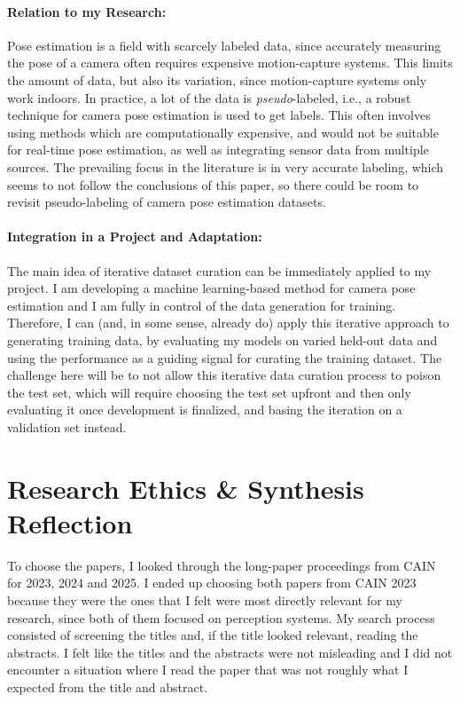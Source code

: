 \documentclass[11pt]{article}
\begin{document}
\paragraph{Relation to my Research:}
Pose estimation is a field with scarcely labeled data, since accurately measuring the pose of a camera often requires expensive motion-capture systems.
This limits the amount of data, but also its variation, since motion-capture systems only work indoors.
In practice, a lot of the data is \emph{pseudo}-labeled, i.e., a robust technique for camera pose estimation is used to get labels.
This often involves using methods which are computationally expensive, and would not be suitable for real-time pose estimation, as well as integrating sensor data from multiple sources.
The prevailing focus in the literature is in very accurate labeling, which seems to not follow the conclusions of this paper, so there could be room to revisit pseudo-labeling of camera pose estimation datasets.

\paragraph{Integration in a Project and Adaptation:}
The main idea of iterative dataset curation can be immediately applied to my project.
I am developing a machine learning-based method for camera pose estimation and I am fully in control of the data generation for training.
Therefore, I can (and, in some sense, already do) apply this iterative approach to generating training data, by evaluating my models on varied held-out data and using the performance as a guiding signal for curating the training dataset.
The challenge here will be to not allow this iterative data curation process to poison the test set, which will require choosing the test set upfront and then only evaluating it once development is finalized, and basing the iteration on a validation set instead.

\section{Research Ethics \& Synthesis Reflection}

To choose the papers, I looked through the long-paper proceedings from CAIN for 2023, 2024 and 2025.
I ended up choosing both papers from CAIN 2023 because they were the ones that I felt were most directly relevant for my research, since both of them focused on perception systems.
My search process consisted of screening the titles and, if the title looked relevant, reading the abstracts.
I felt like the titles and the abstracts were not misleading and I did not encounter a situation where I read the paper that was not roughly what I expected from the title and abstract.
\end{document}
